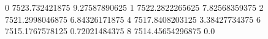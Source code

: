 0 7523.732421875 9.27587890625
1 7522.2822265625 7.82568359375
2 7521.2998046875 6.84326171875
4 7517.8408203125 3.38427734375
6 7515.1767578125 0.72021484375
8 7514.45654296875 0.0
